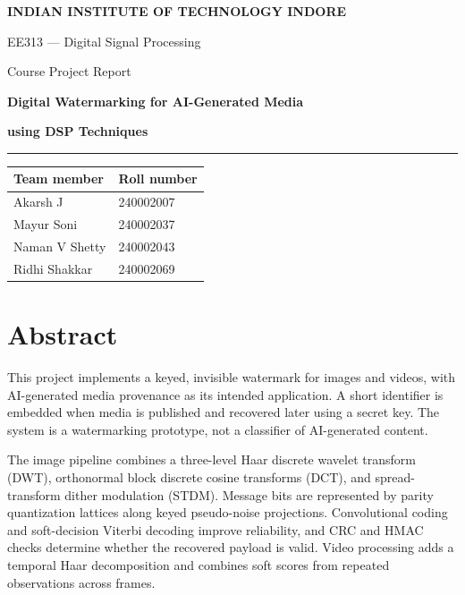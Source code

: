 \documentclass[11pt,a4paper]{article}
\begin{document}
\hypersetup{pageanchor=false}

\begin{titlepage}
\centering
\vspace*{22mm}
{\fontsize{16}{20}\selectfont\bfseries INDIAN INSTITUTE OF TECHNOLOGY INDORE\par}
\vspace{7mm}
{\large EE313 --- Digital Signal Processing\par}
\vspace{22mm}
{\large Course Project Report\par}
\vspace{12mm}
{\color{navy}\fontsize{18}{22}\selectfont\bfseries Digital Watermarking for AI-Generated Media\par}
\vspace{5mm}
{\color{navy}\fontsize{15}{18}\selectfont\bfseries using DSP Techniques\par}
\vspace{22mm}
\rule{0.82\textwidth}{0.6pt}
\vspace{8mm}
\begin{tabular}{ll}
\textbf{Team member} & \textbf{Roll number} \\
\midrule
Akarsh J & 240002007 \\
Mayur Soni & 240002037 \\
Naman V Shetty & 240002043 \\
Ridhi Shakkar & 240002069 \\
\end{tabular}
\end{titlepage}
\restoregeometry

\hypersetup{pageanchor=true}
{\small\setlength{\parskip}{0pt}\tableofcontents}
\clearpage
\section*{Abstract}
This project implements a keyed, invisible watermark for images and videos, with
AI-generated media provenance as its intended application. A short identifier is
embedded when media is published and recovered later using a secret key. The
system is a watermarking prototype, not a classifier of AI-generated content.

The image pipeline combines a three-level Haar discrete wavelet transform (DWT),
orthonormal block discrete cosine transforms (DCT), and spread-transform dither
modulation (STDM). Message bits are represented by parity quantization lattices
along keyed pseudo-noise projections. Convolutional coding and soft-decision
Viterbi decoding improve reliability, and CRC and HMAC checks determine whether
the recovered payload is valid. Video processing adds a temporal Haar
decomposition and combines soft scores from repeated observations across frames.
\end{document}
